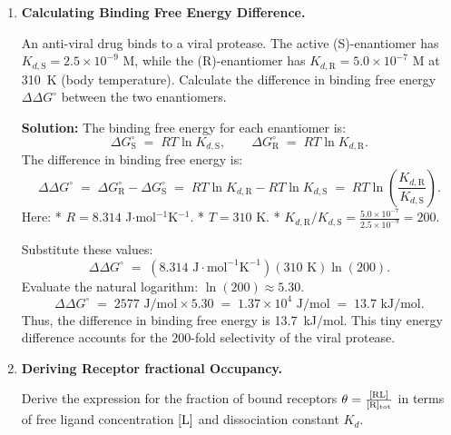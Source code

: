 \documentclass[12pt, a4paper]{book}
\begin{document}
\begin{problembox}
\begin{enumerate}[label=\textbf{E\arabic*.}]
  \item \textbf{Calculating Binding Free Energy Difference.}
  
        An anti-viral drug binds to a viral protease. The active (S)-enantiomer has $K_{d,\text{S}} = 2.5 \times 10^{-9}$ M, while the (R)-enantiomer has $K_{d,\text{R}} = 5.0 \times 10^{-7}$ M at \SI{310}{K} (body temperature).
        Calculate the difference in binding free energy $\Delta \Delta G^\circ$ between the two enantiomers.
        
        \textbf{Solution:}
        The binding free energy for each enantiomer is:
        \[
          \Delta G^\circ_{\text{S}} \;=\; R T \ln K_{d,\text{S}}, \qquad \Delta G^\circ_{\text{R}} \;=\; R T \ln K_{d,\text{R}}.
        \]
        The difference in binding free energy is:
        \[
          \Delta \Delta G^\circ \;=\; \Delta G^\circ_{\text{R}} - \Delta G^\circ_{\text{S}} \;=\; R T \ln K_{d,\text{R}} - R T \ln K_{d,\text{S}} \;=\; R T \ln\left( \frac{K_{d,\text{R}}}{K_{d,\text{S}}} \right).
        \]
        Here:
        * $R = 8.314$ J$\cdot$mol$^{-1}$K$^{-1}$.
        * $T = 310$ K.
        * $K_{d,\text{R}}/K_{d,\text{S}} = \frac{5.0 \times 10^{-7}}{2.5 \times 10^{-9}} = 200$.
        
        Substitute these values:
        \[
          \Delta \Delta G^\circ \;=\; \left( 8.314 \text{ J}\cdot\text{mol}^{-1}\text{K}^{-1} \right) \left( 310 \text{ K} \right) \ln(200).
        \]
        Evaluate the natural logarithm: $\ln(200) \approx 5.30$.
        \[
          \Delta \Delta G^\circ \;=\; 2577 \text{ J/mol} \times 5.30 \;=\; 1.37 \times 10^4 \text{ J/mol} \;=\; 13.7 \text{ kJ/mol}.
        \]
        Thus, the difference in binding free energy is \SI{13.7}{kJ/mol}. This tiny energy difference accounts for the $200$-fold selectivity of the viral protease.
        
  \item \textbf{Deriving Receptor fractional Occupancy.}
  
        Derive the expression for the fraction of bound receptors $\theta = \frac{[\ce{RL}]}{[\ce{R}]_{\text{tot}}}$ in terms of free ligand concentration $[\ce{L}]$ and dissociation constant $K_d$.
        

\end{enumerate}
\end{problembox}
\end{document}
